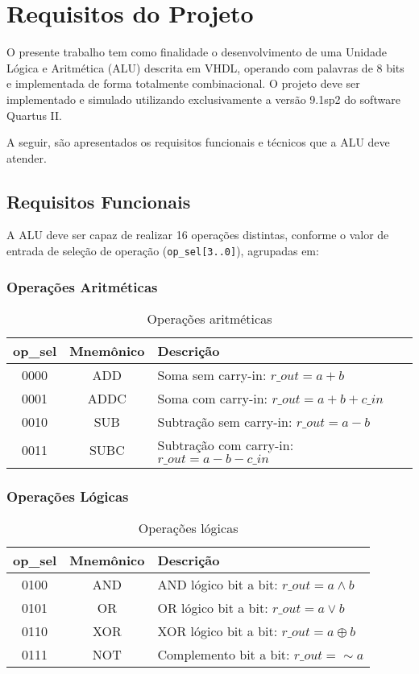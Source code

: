 \section{Requisitos do Projeto}

O presente trabalho tem como finalidade o desenvolvimento de uma Unidade Lógica e Aritmética (ALU) descrita em VHDL, operando com palavras de 8 bits e implementada de forma totalmente combinacional. O projeto deve ser implementado e simulado utilizando exclusivamente a versão 9.1sp2 do software Quartus II.

A seguir, são apresentados os requisitos funcionais e técnicos que a ALU deve atender.

\subsection{Requisitos Funcionais}

A ALU deve ser capaz de realizar 16 operações distintas, conforme o valor de entrada de seleção de operação (\texttt{op\_sel[3..0]}), agrupadas em:

\subsubsection*{Operações Aritméticas}

\begin{table}[H]
\centering
\begin{tabular}{|c|c|l|}
\hline
\textbf{op\_sel} & \textbf{Mnemônico} & \textbf{Descrição} \\ \hline
0000 & ADD  & Soma sem carry-in: $r\_out = a + b$ \\ \hline
0001 & ADDC & Soma com carry-in: $r\_out = a + b + c\_in$ \\ \hline
0010 & SUB  & Subtração sem carry-in: $r\_out = a - b$ \\ \hline
0011 & SUBC & Subtração com carry-in: $r\_out = a - b - c\_in$ \\ \hline
\end{tabular}
\caption{Operações aritméticas}
\end{table}

\subsubsection*{Operações Lógicas}

\begin{table}[H]
\centering
\begin{tabular}{|c|c|l|}
\hline
\textbf{op\_sel} & \textbf{Mnemônico} & \textbf{Descrição} \\ \hline
0100 & AND  & AND lógico bit a bit: $r\_out = a \land b$ \\ \hline
0101 & OR   & OR lógico bit a bit: $r\_out = a \lor b$ \\ \hline
0110 & XOR  & XOR lógico bit a bit: $r\_out = a \oplus b$ \\ \hline
0111 & NOT  & Complemento bit a bit: $r\_out = \sim a$ \\ \hline
\end{tabular}
\caption{Operações lógicas}
\end{table}

